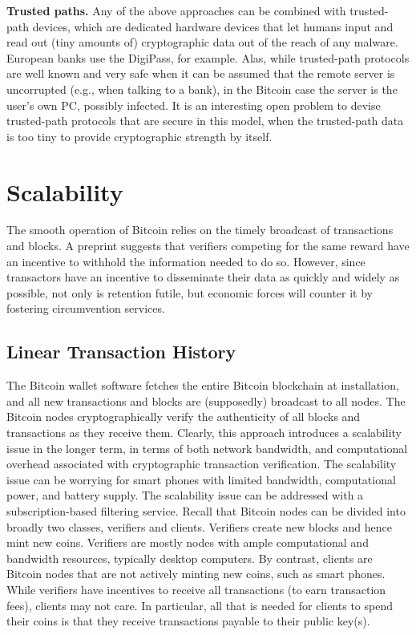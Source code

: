 \textbf{Trusted paths.} Any of the above approaches can be combined with trusted-path devices,
which are dedicated hardware devices that let humans input and read out (tiny
amounts of) cryptographic data out of the reach of any malware. European banks use
the DigiPass, for example. Alas, while trusted-path protocols are well known and very
safe when it can be assumed that the remote server is uncorrupted (e.g., when talking
to a bank), in the Bitcoin case the server is the user’s own PC, possibly infected. It is an
interesting open problem to devise trusted-path protocols that are secure in this model,
when the trusted-path data is too tiny to provide cryptographic strength by itself.

\section{Scalability}
The smooth operation of Bitcoin relies on the timely broadcast of transactions and
blocks. A preprint  suggests that verifiers competing for the same reward have an
incentive to withhold the information needed to do so. However, since transactors have
an incentive to disseminate their data as quickly and widely as possible, not only is retention
futile, but economic forces will counter it by fostering circumvention services.

\subsection{Linear Transaction History}
The Bitcoin wallet software fetches the entire Bitcoin blockchain at installation,
and all new transactions and blocks are (supposedly) broadcast to all nodes\cite{lowenthal2011bitcoin}.
The Bitcoin nodes cryptographically verify the authenticity of all blocks and transactions
as they receive them. Clearly, this approach introduces a scalability issue in the
longer term, in terms of both network bandwidth, and computational overhead associated
with cryptographic transaction verification. The scalability issue can be worrying
for smart phones with limited bandwidth, computational power, and battery supply.
The scalability issue can be addressed with a subscription-based filtering service.
Recall that Bitcoin nodes can be divided into broadly two classes, verifiers and clients.
Verifiers create new blocks and hence mint new coins. Verifiers are mostly nodes with
ample computational and bandwidth resources, typically desktop computers. By contrast,
clients are Bitcoin nodes that are not actively minting new coins, such as smart
phones. While verifiers have incentives to receive all transactions (to earn transaction
fees), clients may not care. In particular, all that is needed for clients to spend their
coins is that they receive transactions payable to their public key(s)\cite{luther2013cryptocurrencies}.

